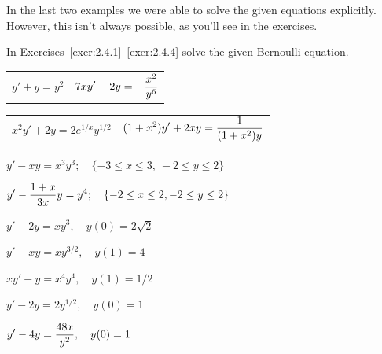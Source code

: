 In the last two examples we were able to solve the given equations explicitly. However, this isn't
always possible, as you'll see in the exercises.

\exercises In Exercises~\ref{exer:2.4.1}--\ref{exer:2.4.4} solve the given Bernoulli equation.

\begin{exerciselist}
  \begin{tabular}[t]{@{}p{168pt}@{}p{168pt}}
    \item\label{exer:2.4.1} $y'+y=y^{2}$ &
    \item\label{exer:2.4.2} $\displaystyle{7xy'-2y=-\frac{x^{2}}{y^{6}}}$
  \end{tabular}

  \begin{tabular}[t]{@{}p{168pt}@{}p{168pt}}
    \item\label{exer:2.4.3} $x^{2}y'+2y=2e^{1/x}y^{1/2}$ &

    \item\label{exer:2.4.4} \vspace*{-5pt}$\displaystyle{(1+x^{2})y'+2xy =\frac{1}{(1+x^{2})y}}$
  \end{tabular}


  \item\label{exer:2.4.5} \CGex $y'-xy=x^{3}y^{3};\quad\{-3\le x\le3,\ -2\le y\le 2\}$

  \item\label{exer:2.4.6} \CGex $\displaystyle{y'-\frac{1+x}{3x}y=y^{4}};\quad\{-2\le x\le2,-2\le y\le2\}$


  \item\label{exer:2.4.7} $y'-2y=xy^{3},\quad y(0)=2\sqrt{2}$

  \item\label{exer:2.4.8} $y'-xy=xy^{3/2},\quad y(1)=4$

  \item\label{exer:2.4.9} $xy'+y=x^{4}y^{4},\quad y(1)=1/2$

  \item\label{exer:2.4.10} $y'-2y=2y^{1/2},\quad y(0)=1$

  \item\label{exer:2.4.11} $\displaystyle{y'-4y=\frac{48x}{y^{2}},\quad y(0)=1}$


\end{exerciselist}
